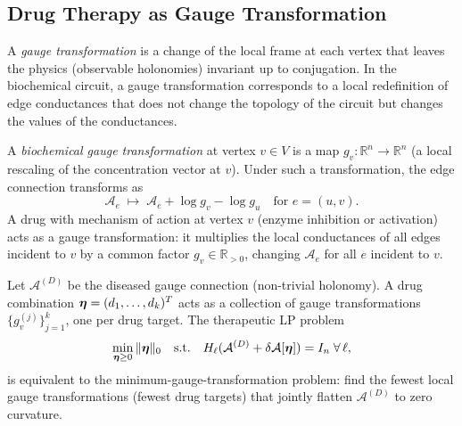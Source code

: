 \subsection{Drug Therapy as Gauge Transformation}
\label{subsec:ch11-drug-gauge}

A \emph{gauge transformation} is a change of the local frame at each vertex
that leaves the physics (observable holonomies) invariant up to conjugation.
In the biochemical circuit, a gauge transformation corresponds to a
local redefinition of edge conductances that does not change the topology
of the circuit but changes the values of the conductances.

\begin{definition}
\label{def:ch11-gauge-transformation}
A \emph{biochemical gauge transformation} at vertex $v \in V$ is a map
$g_v: \mathbb{R}^n \to \mathbb{R}^n$ (a local rescaling of the concentration
vector at $v$).  Under such a transformation, the edge connection transforms as
\[
  \mathcal{A}_e \;\mapsto\; \mathcal{A}_e + \log g_v - \log g_u
  \quad \text{for } e = (u,v).
\]
A drug with mechanism of action at vertex $v$ (enzyme inhibition or activation)
acts as a gauge transformation: it multiplies the local conductances of all
edges incident to $v$ by a common factor $g_v \in \mathbb{R}_{>0}$, changing
$\mathcal{A}_e$ for all $e$ incident to $v$.
\end{definition}

\begin{theorem}
\label{thm:ch11-gauge-flattening}
Let $\mathcal{A}^{(D)}$ be the diseased gauge connection (non-trivial holonomy).
A drug combination $\boldsymbol{\eta} = (d_1, \ldots, d_k)^T$ acts as a collection of
gauge transformations $\{g_v^{(j)}\}_{j=1}^k$, one per drug target.  The
therapeutic LP problem
\[
  \min_{\boldsymbol{\eta} \geq 0} \|\boldsymbol{\eta}\|_0
  \quad \text{s.t.} \quad
  H_\ell(\mathcal{A}^{(D)} + \delta\mathcal{A}[\boldsymbol{\eta}]) = I_n
  \;\forall\, \ell,
\]
is equivalent to the minimum-gauge-transformation problem: find the fewest
local gauge transformations (fewest drug targets) that jointly flatten
$\mathcal{A}^{(D)}$ to zero curvature.
\end{theorem}

